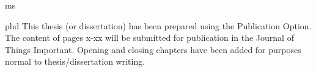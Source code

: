 \documentclass[times,12pt,titlepage]{mstthesis}
\begin{document}

\begin{ThesisTitlePage}{ms}

\author{\MakeUppercase{I. M. Author}}







\end{ThesisTitlePage}




\begin{ThesisPublicationOption}{phd}
  This thesis (or dissertation) has been prepared using the
  Publication Option.  The content of pages x-xx will be submitted for
  publication in the Journal of Things Important.  Opening and closing
  chapters have been added for purposes normal to thesis/dissertation
  writing.
\end{ThesisPublicationOption}


\begin{ThesisAbstract}
\lipsum[1]
\end{ThesisAbstract}


\begin{ThesisAcknowledgment}
\lipsum[2-3]
\end{ThesisAcknowledgment}

\begin{ThesisFrontMatter}
\tableofcontents
\listoffigures
\listoftables
\end{ThesisFrontMatter}

\end{document}
